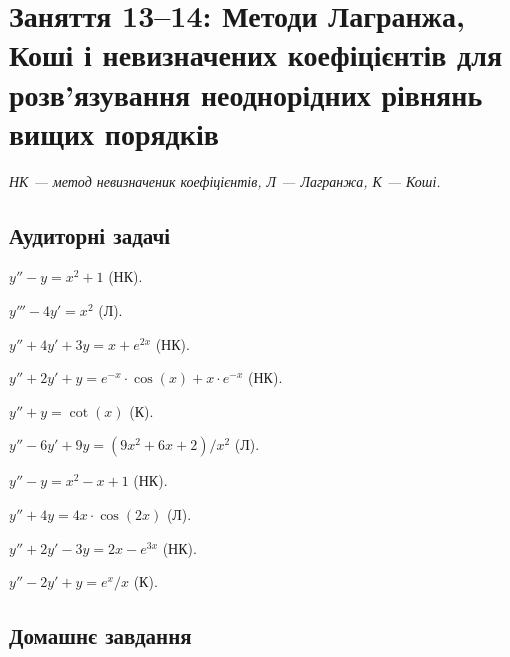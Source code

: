 \section*{Заняття 13--14: Методи Лагранжа, Коші і невизначених коефіцієнтів для розв'язування неоднорідних рівнянь вищих порядків}

\textit{НК --- метод невизначеник коефіцієнтів, Л --- Лагранжа, К --- Коші.}

\subsection*{Аудиторні задачі}

\begin{problem}
	$y'' - y = x^2 + 1$ (НК).
\end{problem}

\begin{problem}
	$y''' - 4 y' = x^2$ (Л).
\end{problem}

\begin{problem}
	$y'' + 4 y' + 3y = x + e^{2 x}$ (НК).
\end{problem}

\begin{problem}
	$y'' + 2 y' + y = e^{-x} \cdot \cos (x) + x \cdot e^{-x}$ (НК).
\end{problem}

\begin{problem}
	$y'' + y = \cot (x)$ (К).
\end{problem}

\begin{problem}
	$y'' - 6 y' + 9 y = (9 x^2 + 6 x + 2) / x^2$ (Л).
\end{problem}

\begin{problem}
	$y'' - y = x^2 - x + 1$ (НК).
\end{problem}

\begin{problem}
	$y'' + 4 y = 4 x \cdot \cos (2 x)$ (Л).
\end{problem}

\begin{problem}
	$y'' + 2 y' - 3 y = 2 x - e^{3 x}$ (НК).
\end{problem}

\begin{problem}
	$y'' - 2 y' + y = e^x / x$ (К).
\end{problem}

\subsection*{Домашнє завдання}

